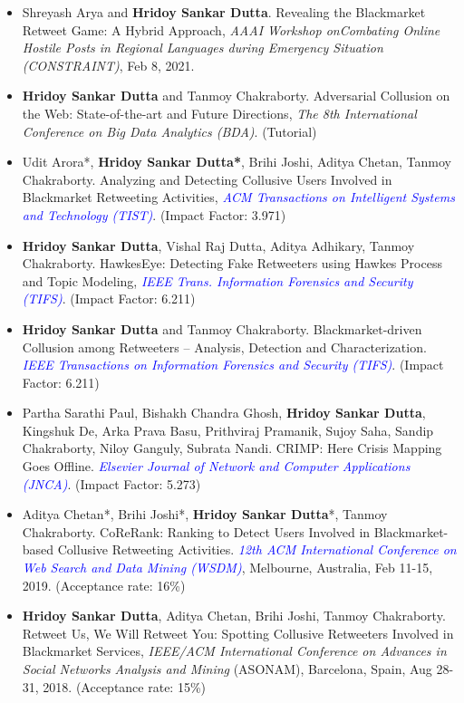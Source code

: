 \documentclass[margin, centered]{res}
\begin{document}
\begin{resume}
\begin{itemize}[leftmargin=*]
\item Shreyash Arya and \textbf{Hridoy Sankar Dutta}. Revealing the Blackmarket Retweet Game: A Hybrid Approach, \textit{AAAI Workshop on ​Combating On​line Ho​st​ile Posts in ​Regional L​anguages dur​ing Emerge​ncy Si​tuation (CONSTRAINT)}, Feb 8, 2021.

\item \textbf{Hridoy Sankar Dutta} and Tanmoy Chakraborty. Adversarial Collusion on the Web: State-of-the-art and Future Directions,  \textit{The 8th International Conference on Big Data Analytics (BDA)}. (Tutorial)

\item Udit Arora*, \textbf{Hridoy Sankar Dutta*}, Brihi Joshi, Aditya Chetan, Tanmoy Chakraborty. Analyzing and Detecting Collusive Users Involved in Blackmarket Retweeting Activities,  \textit{\textcolor{blue}{ACM Transactions on Intelligent Systems and Technology (TIST)}}. (Impact Factor: 3.971)

\item \textbf{Hridoy Sankar Dutta}, Vishal Raj Dutta, Aditya Adhikary, Tanmoy Chakraborty. HawkesEye: Detecting Fake Retweeters using Hawkes Process and Topic Modeling,  \textit{\textcolor{blue}{IEEE Trans. Information Forensics and Security (TIFS)}}. (Impact Factor: 6.211)

\item \textbf{Hridoy Sankar Dutta} and Tanmoy Chakraborty. Blackmarket-driven Collusion among Retweeters – Analysis, Detection and Characterization. \textit{\textcolor{blue}{IEEE Transactions on Information Forensics and Security (TIFS)}}. (Impact Factor: 6.211)

\item Partha Sarathi Paul, Bishakh Chandra Ghosh, \textbf{Hridoy Sankar Dutta}, Kingshuk De, Arka Prava Basu, Prithviraj Pramanik, Sujoy Saha, Sandip Chakraborty, Niloy Ganguly, Subrata Nandi. CRIMP: Here Crisis Mapping Goes Offline. \textit{\textcolor{blue}{Elsevier Journal of Network and Computer Applications (JNCA)}}. (Impact Factor: 5.273)

\item  Aditya Chetan*, Brihi Joshi*, \textbf{Hridoy Sankar Dutta}*, Tanmoy Chakraborty. CoReRank: Ranking to Detect Users Involved in Blackmarket-based Collusive Retweeting Activities. \textit{\textcolor{blue}{12th ACM International Conference on Web Search and Data Mining (WSDM)}}, Melbourne, Australia, Feb 11-15, 2019. (Acceptance rate: 16\%)


\item \textbf{Hridoy Sankar Dutta}, Aditya Chetan, Brihi Joshi, Tanmoy Chakraborty. Retweet Us, We Will Retweet You: Spotting Collusive Retweeters Involved in Blackmarket Services, \textit{IEEE/ACM International Conference on Advances in Social Networks Analysis and Mining} (ASONAM), Barcelona, Spain, Aug 28-31, 2018. (Acceptance rate: 15\%)


\end{itemize}
\end{resume}
\end{document}
